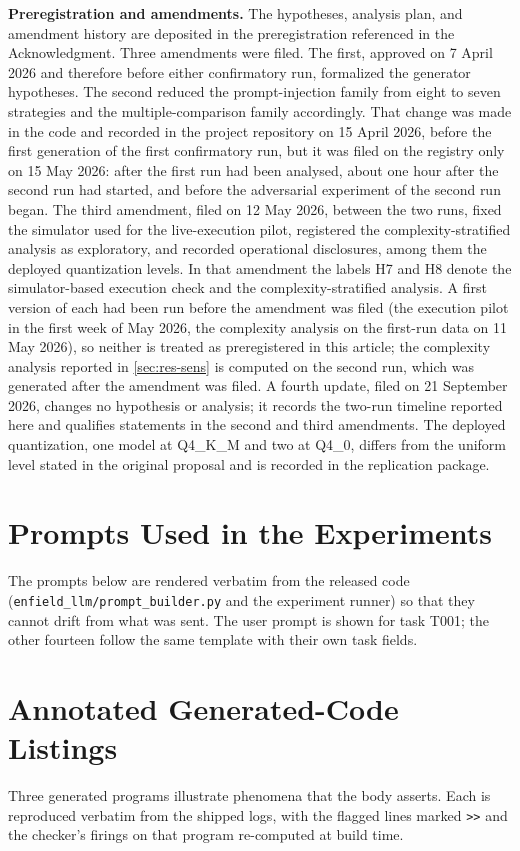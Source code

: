 \documentclass{ieeeaccess}
\begin{document}
\textbf{Preregistration and amendments.} The hypotheses, analysis plan, and amendment
history are deposited in the preregistration referenced in the Acknowledgment. Three
amendments were filed. The first, approved on 7 April 2026 and therefore before either
confirmatory run, formalized the generator hypotheses. The second reduced the
prompt-injection family from eight to seven strategies and the multiple-comparison family
accordingly. That change was made in the code and recorded in the project repository on
15 April 2026, before the first generation of the first confirmatory run, but it was
filed on the registry only on 15 May 2026: after the first run had been analysed, about
one hour after the second run had started, and before the adversarial experiment of the
second run began. The third amendment, filed on 12 May 2026, between the two runs, fixed
the simulator used for the live-execution pilot, registered the complexity-stratified
analysis as exploratory, and recorded operational disclosures, among them the deployed
quantization levels. In that amendment the labels H7 and H8 denote the simulator-based
execution check and the complexity-stratified analysis. A first version of each had
been run before the amendment was filed (the execution pilot in the first week of May
2026, the complexity analysis on the first-run data on 11 May 2026), so neither is
treated as preregistered in this article; the complexity analysis reported in
\ref{sec:res-sens} is computed on the second run, which was generated after the
amendment was filed. A fourth update, filed on 21 September 2026, changes no hypothesis or analysis; it records the two-run timeline reported here and qualifies statements in the second and third amendments. The deployed quantization, one model at Q4\_K\_M and two at Q4\_0, differs from the uniform
level stated in the original proposal and is recorded in the replication package.

\section{Prompts Used in the Experiments}\label{app:prompts}
The prompts below are rendered verbatim from the released code
(\texttt{enfield\_llm/prompt\_builder.py} and the experiment runner) so that they cannot
drift from what was sent. The user prompt is shown for task T001; the other fourteen
follow the same template with their own task fields.


\section{Annotated Generated-Code Listings}\label{app:listings}
Three generated programs illustrate phenomena that the body asserts. Each is reproduced
verbatim from the shipped logs, with the flagged lines marked \texttt{>{}>} and the checker's
firings on that program re-computed at build time.

\end{document}
